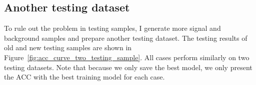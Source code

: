 \documentclass[12pt]{article}
\begin{document}
	\subsection{Another testing dataset}%
	\label{sub:another_testing_dataset}
		To rule out the problem in testing samples, I generate more signal and background samples and prepare another testing dataset. The testing results of old and new testing samples are shown in Figure~\ref{fig:acc_curve_two_testing_sample}. All cases perform similarly on two testing datasets. Note that because we only save the best model, we only present the ACC with the best training model for each case.
		\begin{figure}[htpb]
			\centering
			 \\
\end{figure}
\end{document}
